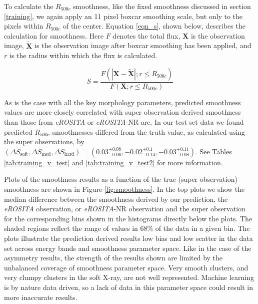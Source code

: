 To calculate the $R_{500c}$ smoothness, like the fixed smoothness discussed in section \ref{training}, we again apply an 11 pixel boxcar smoothing scale, but only to the pixels within $R_{500c}$ of the center. Equation \ref{eqn_s}, shown below, describes the calculation for smoothness. Here $F$ denotes the total flux, $\mathbf{X}$ is the observation image, $\mathbf{\tilde{X}}$ is the observation image after boxcar smoothing has been applied, and $r$ is the radius within which the flux is calculated.

\begin{equation}\label{eqn_s}
    S = \frac{F(|\mathbf{X}-\mathbf{\tilde{X}}|;r\leq R_{500c})}{F(\mathbf{X};r\leq R_{500c})}
\end{equation}


As is the case with all the key morphology parameters, predicted smoothness values are more closely correlated with super observation derived smoothness than those from \textit{eROSITA} or \textit{eROSITA}-NR are. In our test set data we found predicted $R_{500c}$ smoothnesses differed from the truth value, as calculated using the super observations, by $(\Delta S_{\mathrm{soft}},\Delta S_{\mathrm{med}},\Delta S_{\mathrm{hard}}) = (0.03_{-0.06}^{+0.08}, -0.02_{-0.14}^{+0.1}, -0.03_{-0.08}^{+0.11})$. See Tables \ref{tab:training_v_test} and \ref{tab:training_v_test2} for more information.

Plots of the smoothness results as a function of the true (super observation) smoothness are shown in Figure \ref{fig:smoothness}. In the top plots we show the median difference between the smoothness derived by our prediction, the \textit{eROSITA} observation, or \textit{eROSITA}-NR observation and the super observation for the corresponding bins shown in the histograms directly below the plots. The shaded regions reflect the range of values in 68\% of the data in a given bin. The plots illustrate the prediction derived results low bias and low scatter in the data set across energy bands and smoothness parameter space. Like in the case of the asymmetry results, the strength of the results shown are limited by the unbalanced coverage of smoothness parameter space. Very smooth clusters, and very clumpy clusters in the soft X-ray, are not well represented. Machine learning is by nature data driven, so a lack of data in this parameter space could result in more inaccurate results.

